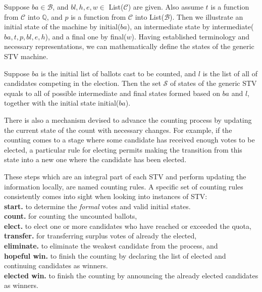 \documentclass{llncs}
\begin{document}
Suppose $ba \in\mathcal{B}$, and $bl , h, e, w \in$ \textsf{List}($\mathcal{C}$) are given. Also assume $t$ is a function from $\mathcal{C}$ into $\mathbb{Q}$, and $p$ is a function from $\mathcal{C}$ into \textsf{List}($\mathcal{B}$). Then we illustrate an initial state of the machine by \textsf{initial}($ba$), an intermediate state by \textsf{intermediate}($ba, t, p, bl, e, h$), and a final one by \textsf{final}($w$). Having established terminology and necessary representations, we can mathematically define the states of the generic STV machine. 
\begin{definition}\label{stv:states}
Suppose $ba$ is the initial list of ballots cast to be counted, and $l$ is the list of all of candidates competing in the election. Then the set $\mathcal{S}$ of states of the generic STV equals to all of possible intermediate and final states formed based on $ba$ and $l$, together with the initial state \textsf{initial}($ba$).
\end{definition}
There is also a mechanism devised to advance the counting process by updating the current state of the count with necessary changes. For example, if the counting comes to a stage where some candidate has received enough votes to be elected, a particular rule for electing permits making the transition from this state into a new one where the candidate has been elected. 


These steps which are an integral part of each STV and perform updating the information locally, are named counting rules. A specific set of counting rules consistently comes into sight when looking into instances of STV:
\\
\noindent\textbf{start.} to determine the \emph{formal} votes and valid initial states.\\
\noindent\textbf{count.} for counting the uncounted ballots,\\
\noindent\textbf{elect.} to elect one or more candidates who have reached or exceeded the quota,\\ 
\noindent\textbf{transfer.} for transferring surplus votes of already the elected, \\
\noindent\textbf{eliminate.} to eliminate the weakest candidate from the process, and\\ 
\noindent\textbf{hopeful win.} to finish the counting by declaring the list of elected and continuing candidates as winners.\\
\noindent\textbf{elected win.} to finish the counting by announcing the  already elected candidates as winners. 
\end{document}
